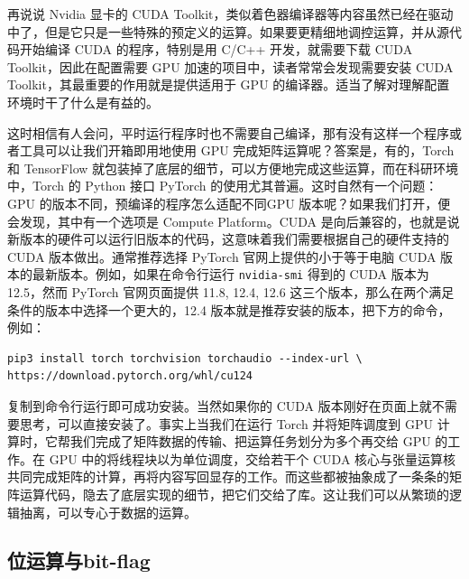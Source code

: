 再说说 Nvidia 显卡的 CUDA Toolkit，类似着色器编译器等内容虽然已经在驱动中了，但是它只是一些特殊的预定义的运算。如果要更精细地调控运算，并从源代码开始编译 CUDA 的程序，特别是用 C/C++ 开发，就需要下载 CUDA Toolkit，因此在配置需要 GPU 加速的项目中，读者常常会发现需要安装 CUDA Toolkit，其最重要的作用就是提供适用于 GPU 的编译器。适当了解对理解配置环境时干了什么是有益的。

这时相信有人会问，平时运行程序时也不需要自己编译，那有没有这样一个程序或者工具可以让我们开箱即用地使用 GPU 完成矩阵运算呢？答案是，有的，Torch 和 TensorFlow 就包装掉了底层的细节，可以方便地完成这些运算，而在科研环境中，Torch 的 Python 接口 PyTorch 的使用尤其普遍。这时自然有一个问题：GPU 的版本不同，预编译的程序怎么适配不同GPU 版本呢？如果我们打开，便会发现，其中有一个选项是 Compute Platform。CUDA 是向后兼容的，也就是说新版本的硬件可以运行旧版本的代码，这意味着我们需要根据自己的硬件支持的 CUDA 版本做出。通常推荐选择 PyTorch 官网上提供的小于等于电脑 CUDA 版本的最新版本。例如，如果在命令行运行 \texttt{nvidia-smi} 得到的 CUDA 版本为 12.5，然而 PyTorch 官网页面提供 11.8, 12.4, 12.6 这三个版本，那么在两个满足条件的版本中选择一个更大的，12.4 版本就是推荐安装的版本，把下方的命令，例如：
\begin{verbatim}
pip3 install torch torchvision torchaudio --index-url \
https://download.pytorch.org/whl/cu124
\end{verbatim}
复制到命令行运行即可成功安装。当然如果你的 CUDA 版本刚好在页面上就不需要思考，可以直接安装了。事实上当我们在运行 Torch 并将矩阵调度到 GPU 计算时，它帮我们完成了矩阵数据的传输、把运算任务划分为多个再交给 GPU 的工作。在 GPU 中的将线程块以为单位调度，交给若干个 CUDA 核心与张量运算核共同完成矩阵的计算，再将内容写回显存的工作。而这些都被抽象成了一条条的矩阵运算代码，隐去了底层实现的细节，把它们交给了库。这让我们可以从繁琐的逻辑抽离，可以专心于数据的运算。

\subsection{位运算与bit-flag}